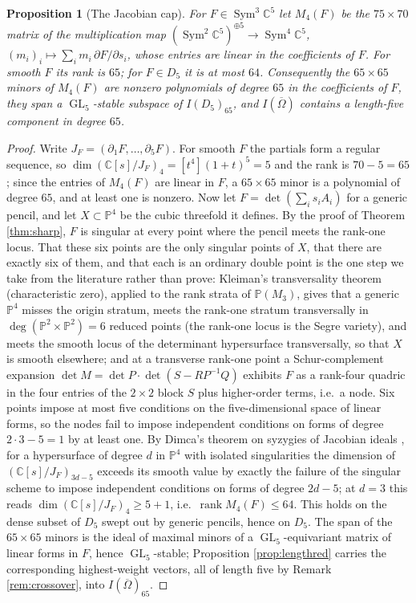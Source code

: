 \documentclass[11pt,reqno]{amsart}
\theoremstyle{plain}
\newtheorem{proposition}[theorem]{Proposition}
\theoremstyle{definition}
\DeclareMathOperator{\GL}{GL}
\DeclareMathOperator{\Sym}{Sym}
\newcommand{\cO}{\overline{\Omega}}
\newcommand{\bC}{\mathbb{C}}
\begin{document}
\begin{proposition}[The Jacobian cap]\label{prop:jaccap}
For $F\in\Sym^{3}\bC^{5}$ let $M_4(F)$ be the $75\times70$ matrix of the
multiplication map $(\Sym^{2}\bC^{5})^{\oplus5}\to\Sym^{4}\bC^{5}$,
$(m_i)_i\mapsto\sum_i m_i\,\partial F/\partial s_i$, whose entries are linear
in the coefficients of $F$.  For smooth $F$ its rank is $65$; for $F\in D_5$
it is at most $64$.  Consequently the $65\times65$ minors of $M_4(F)$ are
nonzero polynomials of degree $65$ in the coefficients of $F$, they span a
$\GL_5$-stable subspace of $I(D_5)_{65}$, and $I(\cO)$ contains a
length-five component in degree $65$.
\end{proposition}

\begin{proof}
Write $J_F=(\partial_1F,\dots,\partial_5F)$.  For smooth $F$ the partials
form a regular sequence, so $\dim(\bC[s]/J_F)_4=[t^4](1+t)^5=5$ and the rank
is $70-5=65$; since the entries of $M_4(F)$ are linear in $F$, a
$65\times65$ minor is a polynomial of degree $65$, and at least one is
nonzero.  Now let $F=\det(\sum_is_iA_i)$ for a generic pencil, and let
$X\subset\mathbb{P}^{4}$ be the cubic threefold it defines.  By the proof of
Theorem \ref{thm:sharp}, $F$ is singular at every point where the pencil
meets the rank-one locus.  That these six points are the only singular
points of $X$, that there are exactly six of them, and that each is an
ordinary double point is the one step we take from the literature rather
than prove: Kleiman's transversality theorem \cite{Kleiman} (characteristic
zero), applied to the rank strata of $\mathbb{P}(M_3)$, gives that a generic
$\mathbb{P}^{4}$ misses the origin stratum, meets the rank-one stratum
transversally in $\deg(\mathbb{P}^{2}\times\mathbb{P}^{2})=6$ reduced points
(the rank-one locus is the Segre variety), and meets the smooth locus of the
determinant hypersurface transversally, so that $X$ is smooth elsewhere; and
at a transverse rank-one point a Schur-complement expansion
$\det M=\det P\cdot\det(S-RP^{-1}Q)$ exhibits $F$ as a rank-four quadric in
the four entries of the $2\times2$ block $S$ plus higher-order terms, i.e.\ a
node.  Six points impose at most five conditions on the five-dimensional
space of linear forms, so the nodes fail to impose independent conditions on
forms of degree $2\cdot3-5=1$ by at least one.  By Dimca's theorem on
syzygies of Jacobian ideals \cite[Thm.~3.1]{Dimca13}, for a hypersurface of
degree $d$ in $\mathbb{P}^{4}$ with isolated singularities the dimension of
$(\bC[s]/J_F)_{3d-5}$ exceeds its smooth value by exactly the failure of the
singular scheme to impose independent conditions on forms of degree $2d-5$;
at $d=3$ this reads $\dim(\bC[s]/J_F)_4\ge5+1$, i.e.\ $\operatorname{rank}
M_4(F)\le64$.  This holds on the dense subset of $D_5$ swept out by generic
pencils, hence on $D_5$.  The span of the $65\times65$ minors is the ideal
of maximal minors of a $\GL_5$-equivariant matrix of linear forms in $F$,
hence $\GL_5$-stable; Proposition \ref{prop:lengthred} carries the
corresponding highest-weight vectors, all of length five by Remark
\ref{rem:crossover}, into $I(\cO)_{65}$.
\end{proof}
\end{document}
